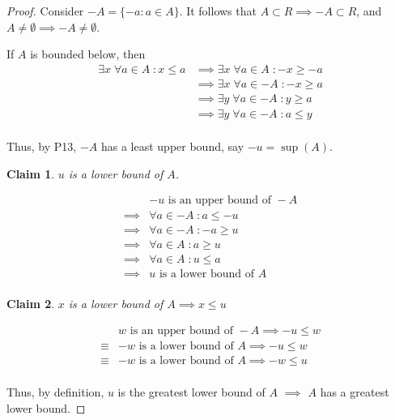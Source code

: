\documentclass{article} %
\theoremstyle{plain}
\newtheorem*{claim*}{Claim}
\theoremstyle{definition}
\begin{document}
\begin{proof}
    Consider $-A = \{ -a : a \in A \}$.  It follows that $A \subset R \implies -A \subset R$, and $A \neq \emptyset \implies -A \neq \emptyset$.

    If $A$ is bounded below, then
    \begin{align*}
        \exists x \; \forall a \in A \; \colon x \leq a & \implies \exists x \; \forall a \in A \; \colon -x \geq -a \\
        & \implies \exists x \; \forall a \in -A \; \colon -x \geq a \\
        & \implies \exists y \; \forall a \in -A \; \colon y \geq a \\
        & \implies \exists y \; \forall a \in -A \; \colon a \leq y \\
    \end{align*}

    Thus, by P13, $-A$ has a least upper bound, say $-u = \sup(A)$.

    \begin{claim*} $u$ is a lower bound of $A$.  
    \end{claim*}

    \begin{align*}
        & -u \text{ is an upper bound of } -A \\
        \implies & \forall a \in -A \; \colon a \leq -u \\
        \implies & \forall a \in -A \; \colon -a \geq u \\
        \implies & \forall a \in A \; \colon a \geq u \\
        \implies & \forall a \in A \; \colon u \leq a \\
        \implies & u \text{ is a lower bound of } A \\
    \end{align*}

    \begin{claim*} $x$ is a lower bound of $A \implies x \leq u$
    \end{claim*}

    \begin{align*}
        & w \text{ is an upper bound of } -A \implies -u \leq w \\
        \equiv & -w \text{ is a lower bound of } A \implies -u \leq w \\
        \equiv & -w \text{ is a lower bound of } A \implies -w \leq u \\ 
    \end{align*}

    Thus, by definition, $u$ is the greatest lower bound of $A$ $\implies$ $A$ has a greatest lower bound.
\end{proof} 
\end{document}
